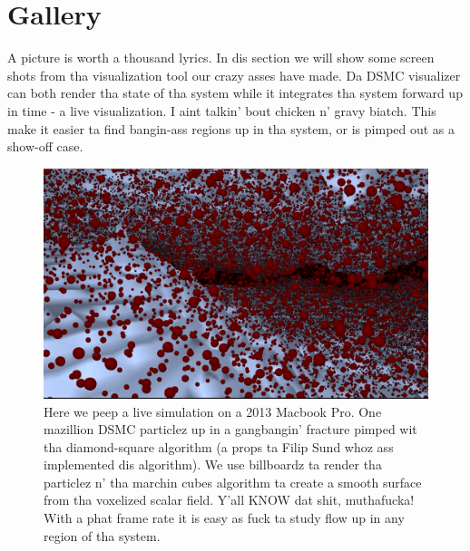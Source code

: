 \section{Gallery}
\label{sec:vis_gallery}
A picture is worth a thousand lyrics. In dis section we will show some screen shots from tha visualization tool our crazy asses have made. Da DSMC visualizer can both render tha state of tha system while it integrates tha system forward up in time - a live visualization. I aint talkin' bout chicken n' gravy biatch. This make it easier ta find bangin-ass regions up in tha system, or is pimped out as a show-off case.

\begin{figure}[htb]
\begin{center}
\includegraphics[width=\textwidth, trim=0cm 0cm 0cm 0cm, clip]{visualization/figures/marching_cubes_fracture.png}
\end{center}
\caption{Here we peep a live simulation on a 2013 Macbook Pro. One mazillion DSMC particlez up in a gangbangin' fracture pimped wit tha diamond-square algorithm (a props ta Filip Sund whoz ass implemented dis algorithm). We use billboardz ta render tha particlez n' tha marchin cubes algorithm ta create a smooth surface from tha voxelized scalar field. Y'all KNOW dat shit, muthafucka! With a phat frame rate it is easy as fuck  ta study flow up in any region of tha system.}
\label{fig:vis_marching_cubes_2}
\end{figure}

